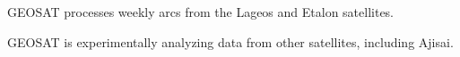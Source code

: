 \settowidth{\hangindent}{GEOSAT }
GEOSAT processes weekly arcs from the Lageos and Etalon satellites. 

\settowidth{\hangindent}{GEOSAT }
GEOSAT is experimentally analyzing data from other satellites,
including Ajisai.

\endinput
